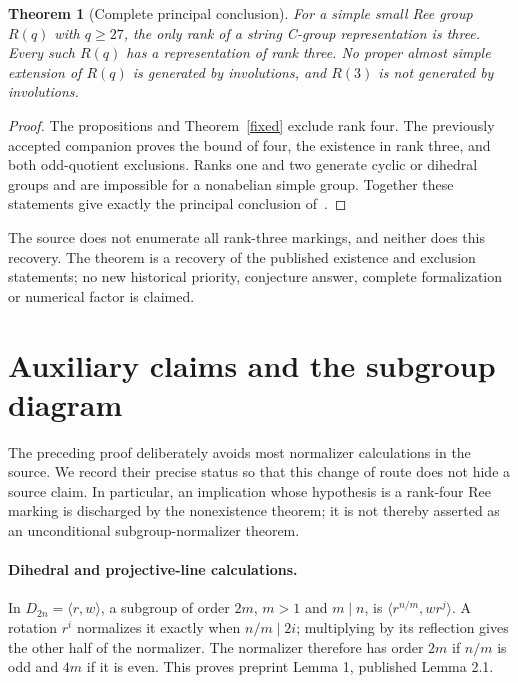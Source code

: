 \documentclass[11pt,a4paper]{article}
\newtheorem{theorem}[lemma]{Theorem}
\newcommand{\gen}[1]{\langle #1\rangle}
\begin{document}
\begin{theorem}[Complete principal conclusion]\label{principal}
For a simple small Ree group $R(q)$ with $q\ge27$, the only rank
of a string C-group representation is three. Every such $R(q)$ has
a representation of rank three. No proper almost simple extension
of $R(q)$ is generated by involutions, and $R(3)$ is not generated
by involutions.
\end{theorem}
\begin{proof}
The propositions and Theorem~\ref{fixed} exclude rank four.
The previously accepted companion proves the bound of four,
the existence in rank three, and both odd-quotient exclusions.
Ranks one and two generate cyclic or dihedral groups and are
impossible for a nonabelian simple group. Together these statements
give exactly the principal conclusion of~\cite[Theorem 1.1]{LSV}.
\end{proof}

The source does not enumerate all rank-three markings, and neither
does this recovery. The theorem is a recovery of the published
existence and exclusion statements; no new historical priority,
conjecture answer, complete formalization or numerical factor is claimed.

\section{Auxiliary claims and the subgroup diagram}
The preceding proof deliberately avoids most normalizer calculations
in the source. We record their precise status so that this change of
route does not hide a source claim. In particular, an implication
whose hypothesis is a rank-four Ree marking is discharged by the
nonexistence theorem; it is not thereby asserted as an unconditional
subgroup-normalizer theorem.

\paragraph{Dihedral and projective-line calculations.}
In $D_{2n}=\gen{r,w}$, a subgroup of order $2m$, $m>1$ and $m\mid n$,
is $\gen{r^{n/m},wr^j}$. A rotation $r^i$ normalizes it exactly when
$n/m\mid2i$; multiplying by its reflection gives the other half of
the normalizer. The normalizer therefore has order $2m$ if $n/m$
is odd and $4m$ if it is even. This proves preprint Lemma 1,
published Lemma 2.1.
\end{document}
